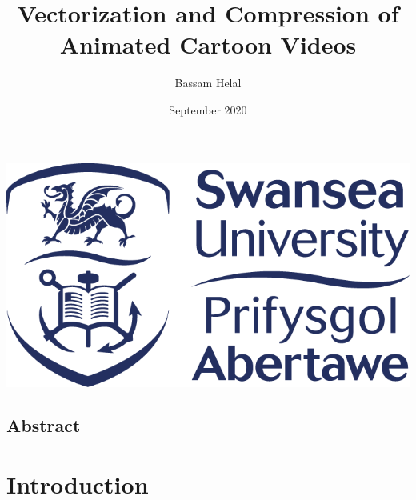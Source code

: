 \documentclass[12pt]{article}
\title{Vectorization and Compression of Animated Cartoon Videos}
\author{Bassam Helal}
\date{September 2020}
\newcommand{\black}{
\pagecolor{black}
\color{white}
}
\begin{document}
    \black



    \maketitle

    \begin{center}
        \vspace{8cm}
        \includegraphics[scale=0.65]{SwanseaUniversityLogo.png}
    \end{center}

    \pagebreak

    \begin{center}
        \section*{Abstract}
    \end{center}


    \pagebreak

    \renewcommand*\contentsname{
    \begin{center}
        Table of Contents
    \end{center}}

    \tableofcontents

    \pagebreak



    \section{Introduction}\label{sec:introduction}
\end{document}
